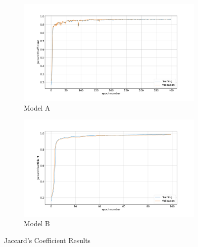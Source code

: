 \documentclass[12pt,a4paper]{scrartcl}
\begin{document}
\begin{figure}[H]
\centering
\begin{subfigure}{1\textwidth}
  \centering
  \includegraphics[width=\linewidth]{./results/model_a_jaccard.png}
  \caption{Model A}
  \label{fig:model_a_jaccard}
\end{subfigure}
\begin{subfigure}{1\textwidth}
  \centering
  \includegraphics[width=\linewidth]{./results/model_b_jaccard.png}
  \caption{Model B}
  \label{fig:modelb_jaccard}
\end{subfigure}
\caption{Jaccard's Coefficient Results}
\label{fig:jaccard_results}
\end{figure}
\end{document}
